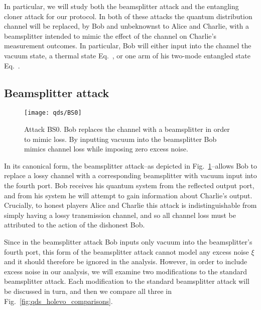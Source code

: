
In particular, we will study both the beamsplitter attack and the entangling cloner attack for our protocol. In both of these attacks the quantum distribution channel will be replaced, by Bob and unbeknownst to Alice and Charlie, with a beamsplitter intended to mimic the effect of the channel on Charlie's measurement outcomes. In particular, Bob will either input into the channel the vacuum state, a thermal state Eq.~, or one arm of his two-mode entangled state Eq.~.

\subsection{Beamsplitter attack}

\begin{figure}[htp]
\centering
\texttt{[image: qds/BS0]}
\caption{\label{fig:bs0_attack} Attack BS$0$. Bob replaces the channel with a beamsplitter in order to mimic loss. By inputting vacuum into the beamsplitter Bob mimics channel loss while imposing zero excess noise.}
\end{figure}
In its canonical form, the beamsplitter attack--as depicted in Fig.~\ref{fig:bs0_attack}--allows Bob to replace a lossy channel with a corresponding beamsplitter with vacuum input into the fourth port. Bob receives his quantum system from the reflected output port, and from his system he will attempt to gain information about Charlie's output. Crucially, to honest players Alice and Charlie this attack is indistinguishable from simply having a lossy transmission channel, and so all channel loss must be attributed to the action of the dishonest Bob. 

Since in the beamsplitter attack Bob inputs only vacuum into the beamsplitter's fourth port, this form of the beamsplitter attack cannot model any excess noise $\xi$ and it should therefore be ignored in the analysis. However, in order to include excess noise in our analysis, we will examine two modifications to the standard beamsplitter attack. Each modification to the standard beamsplitter attack will be discussed in turn, and then we compare all three in Fig.~\ref{fig:qds_holevo_comparisons}. 

